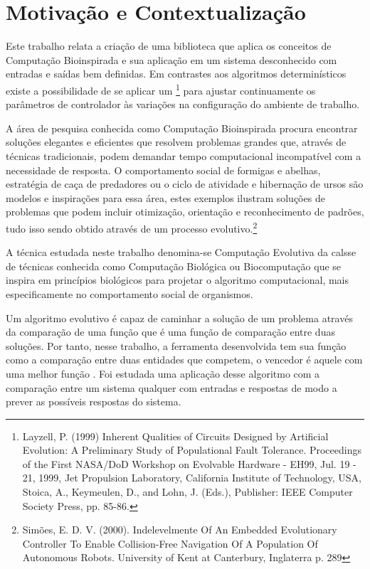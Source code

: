 \section{Motivação e Contextualização}

\newcommand\SistemaEvolutivo{\sigla{SE}{Sistema Evolutivo}}

Este trabalho relata a criação de uma biblioteca que aplica os conceitos de Computação Bioinspirada e sua aplicação em um sistema desconhecido com entradas e saídas bem definidas. Em contrastes aos algoritmos determinísticos existe a possibilidade de se aplicar um \SistemaEvolutivo\footnote{Layzell, P. (1999) Inherent Qualities of Circuits Designed by Artificial Evolution: A Preliminary Study of Populational Fault Tolerance. Proceedings of the First NASA/DoD Workshop on Evolvable Hardware - EH99, Jul. 19 - 21, 1999, Jet Propulsion Laboratory, California Institute of Technology, USA, Stoica, A., Keymeulen, D., and Lohn, J. (Eds.), Publisher: IEEE Computer Society Press, pp. 85-86.} para ajustar continuamente os parâmetros de controlador às variações na configuração do ambiente de trabalho.

A área de pesquisa conhecida como Computação Bioinspirada procura encontrar soluções elegantes e eficientes que resolvem problemas grandes que, através de técnicas tradicionais, podem demandar tempo computacional incompatível com a necessidade de resposta. O comportamento social de formigas e abelhas, estratégia de caça de predadores ou o ciclo de atividade e hibernação de ursos são modelos e inspirações para essa área, estes exemplos ilustram soluções de problemas que podem incluir otimização, orientação e reconhecimento de padrões, tudo isso sendo obtido através de um processo evolutivo.\footnote{Simões, E. D. V. (2000). Indelevelmente Of An Embedded Evolutionary Controller To Enable Collision-Free Navigation Of A Population Of Autonomous Robots. University of Kent at Canterbury, Inglaterra p. 289}

A técnica estudada neste trabalho denomina-se Computação Evolutiva da calsse de técnicas conhecida como Computação Biológica ou Biocomputação que se inspira em princípios biológicos para projetar o algoritmo computacional, mais especificamente no comportamento social de organismos.

Um algoritmo evolutivo é capaz de caminhar a solução de um problema através da comparação de uma função \fitness que é uma função de comparação entre duas soluções. Por tanto, nesse trabalho, a ferramenta desenvolvida tem sua função \fitness como a comparação entre duas entidades que competem, o vencedor é aquele com uma melhor função \fitness. Foi estudada uma aplicação desse algoritmo com a comparação entre um sistema qualquer com entradas e respostas de modo a prever as possíveis respostas do sistema.

